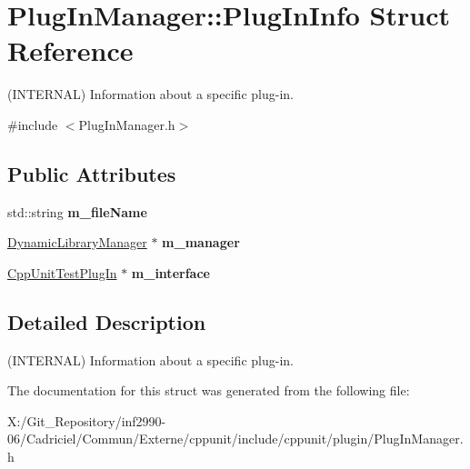 \hypertarget{struct_plug_in_manager_1_1_plug_in_info}{\section{Plug\-In\-Manager\-:\-:Plug\-In\-Info Struct Reference}
\label{struct_plug_in_manager_1_1_plug_in_info}
}


(I\-N\-T\-E\-R\-N\-A\-L) Information about a specific plug-\/in.  




{\ttfamily \#include $<$Plug\-In\-Manager.\-h$>$}

\subsection*{Public Attributes}
\begin{DoxyCompactItemize}
\item 
\hypertarget{struct_plug_in_manager_1_1_plug_in_info_ac084e2efe4d9953812eff03966c06988}{std\-::string {\bfseries m\-\_\-file\-Name}}\label{struct_plug_in_manager_1_1_plug_in_info_ac084e2efe4d9953812eff03966c06988}

\item 
\hypertarget{struct_plug_in_manager_1_1_plug_in_info_a1889712db485e16a29c45ecba4780f0a}{\hyperlink{class_dynamic_library_manager}{Dynamic\-Library\-Manager} $\ast$ {\bfseries m\-\_\-manager}}\label{struct_plug_in_manager_1_1_plug_in_info_a1889712db485e16a29c45ecba4780f0a}

\item 
\hypertarget{struct_plug_in_manager_1_1_plug_in_info_a306eb58a5d6881b117d6bb9a9ae46589}{\hyperlink{struct_cpp_unit_test_plug_in}{Cpp\-Unit\-Test\-Plug\-In} $\ast$ {\bfseries m\-\_\-interface}}\label{struct_plug_in_manager_1_1_plug_in_info_a306eb58a5d6881b117d6bb9a9ae46589}

\end{DoxyCompactItemize}


\subsection{Detailed Description}
(I\-N\-T\-E\-R\-N\-A\-L) Information about a specific plug-\/in. 

The documentation for this struct was generated from the following file\-:\begin{DoxyCompactItemize}
\item 
X\-:/\-Git\-\_\-\-Repository/inf2990-\/06/\-Cadriciel/\-Commun/\-Externe/cppunit/include/cppunit/plugin/Plug\-In\-Manager.\-h\end{DoxyCompactItemize}
